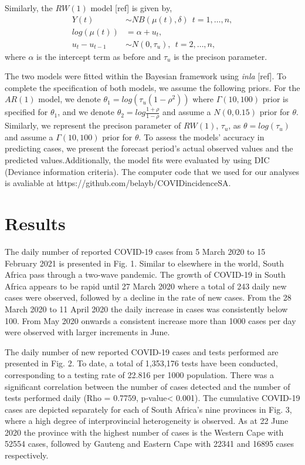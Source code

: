 \documentclass[10pt,letterpaper]{article}
\begin{document}
Similarly, the \(RW(1)\) model {[}ref{]} is given by, \[
\begin{aligned}
 Y(t) &\sim NB(\mu(t), \delta) \ \ t=1, \dots, n,\\
 log(\mu(t)) &= \alpha+u_t, \\
 u_t-u_{t-1} &\sim N(0, \tau_u), \ \ t=2, \dots, n,
\end{aligned}
\] where \(\alpha\) is the intercept term as before and \(\tau_u\) is
the precison parameter.

The two models were fitted within the Bayesian framework using
\emph{inla} {[}ref{]}. To complete the specification of both models, we
assume the following priors. For the \(AR(1)\) model, we denote
\(\theta_1=log(\tau_u(1-\rho^2))\) where \(\Gamma(10,100)\) prior is
specified for \(\theta_1\), and we denote
\(\theta_2=log\frac{1+\rho}{1-\rho}\) and assume a \(N(0, 0.15)\) prior
for \(\theta\). Similarly, we represent the precison parameter of
\(RW(1)\), \(\tau_u\), as \(\theta=log(\tau_u)\) and assume a
\(\Gamma (10,100)\) prior for \(\theta\). To assess the models' accuracy
in predicting cases, we present the forecast period's actual observed
values and the predicted values.Additionally, the model fits were
evaluated by using DIC (Deviance information criteria). The computer
code that we used for our analyses is avaliable at
https://github.com/belayb/COVIDincidenceSA.

\hypertarget{results}{%
\section{Results}\label{results}}

The daily number of reported COVID-19 cases from 5 March 2020 to 15
February 2021 is presented in Fig. 1. Similar to elsewhere in the world,
South Africa pass through a two-wave pandemic. The growth of COVID-19 in
South Africa appears to be rapid until 27 March 2020 where a total of
243 daily new cases were observed, followed by a decline in the rate of
new cases. From the 28 March 2020 to 11 April 2020 the daily increase in
cases was consistently below 100. From May 2020 onwards a consistent
increase more than 1000 cases per day were observed with larger
increments in June.

The daily number of new reported COVID-19 cases and tests performed are
presented in Fig. 2. To date, a total of 1,353,176 tests have been
conducted, corresponding to a testing rate of 22.816 per 1000
population. There was a significant correlation between the number of
cases detected and the number of tests performed daily (Rho = 0.7759,
p-value\textless{} 0.001). The cumulative COVID-19 cases are depicted
separately for each of South Africa's nine provinces in Fig. 3, where a
high degree of interprovincial heterogeneity is observed. As at 22 June
2020 the province with the highest number of cases is the Western Cape
with 52554 cases, followed by Gauteng and Eastern Cape with 22341 and
16895 cases respectively.
\end{document}

